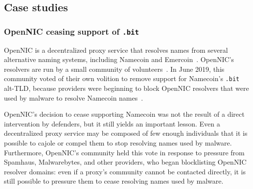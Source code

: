 



\subsection{Case studies}

\subsubsection{OpenNIC ceasing support of \texttt{.bit}}

OpenNIC is a decentralized proxy service that 
resolves names from several alternative naming systems, 
including Namecoin and Emercoin~\cite{opennic}. OpenNIC's 
resolvers are run by a small community of 
volunteers~\cite{opennic_servers}. In June 2019, this 
community voted of their own volition to remove support for 
Namecoin's \texttt{.bit} alt-TLD, because providers were 
beginning to block OpenNIC resolvers that were used by 
malware to resolve Namecoin 
names~\cite{opennic_namecoin_vote}.

OpenNIC's decision to cease supporting Namecoin was not the 
result of a direct intervention by defenders, but it still 
yields an important lesson. Even a decentralized proxy 
service may be composed of few enough individuals that it is 
possible to cajole or compel them to stop resolving names 
used by malware. Furthermore, OpenNIC's community held this 
vote in response to pressure from Spamhaus, Malwarebytes, and 
other providers, who began blocklisting OpenNIC resolver 
domains: even if a proxy's community cannot be contacted 
directly, it is still possible to pressure them to cease 
resolving names used by malware.

